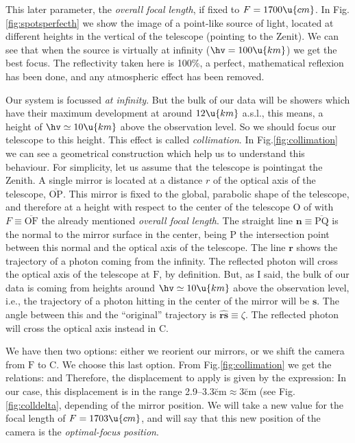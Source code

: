 This later parameter, the \emph{overall focal length}, if fixed to
$F=1700\u{cm}$. In Fig.\ref{fig:spotsperfecth} we show the image of a
point-like source of light, located at different heights \hv in the
vertical of the telescope (pointing to the Zenit). We can see that
when the source is virtually at infinity ($\hv=100\u{km}$) we get the
best focus. The reflectivity taken here is 100\%, a perfect,
mathematical reflexion has been done, and any atmospheric effect has
been removed.

Our system is focussed \emph{at infinity}. But the bulk of our data
will be showers which have their maximum development at around
$12\u{km}$ a.s.l., this means, a height of $\hv\simeq 10\u{km}$ above
the observation level.  So we should focus our telescope to this
height.  This effect is called \emph{collimation}. In
Fig.\ref{fig:collimation} we can see a geometrical construction which
help us to understand this behaviour.  For simplicity, let us assume
that the telescope is pointingat the Zenith. A single mirror is
located at a distance $r$ of the optical axis of the telescope,
$\overline{\mathrm{OP}}$. This mirror is fixed to the global,
parabolic shape of the telescope, and therefore at a height with
respect to the center of the telescope $\mathrm{O}$ of
%
\zparabeq
%
with $F\equiv\overline{\mathrm{OF}}$ the already mentioned
\emph{overall focal length}. The straight line
$\mathbf{n}\equiv\overline{\mathrm{PQ}}$ is the normal to the mirror
surface in the center, being $\mathrm{P}$ the intersection point
between this normal and the optical axis of the telescope. The line
$\mathbf{r}$ shows the trajectory of a photon coming from the
infinity. The reflected photon will cross the optical axis of the
telescope at $\mathrm{F}$, by definition. But, as I said, the bulk of
our data is coming from heights around $\hv\simeq 10\u{km}$ above the
observation level, i.e., the trajectory of a photon hitting in the
center of the mirror will be $\mathbf{s}$. The angle between this and
the ``original'' trajectory is $\widehat{\mathbf{rs}}\equiv\zeta$. The
reflected photon will cross the optical axis instead in $\mathrm{C}$.

\collimationfig

\colldeltafig

We have then two options: either we reorient our mirrors, or we shift
the camera from $\mathrm{F}$ to $\mathrm{C}$. We choose this last
option. From Fig.\ref{fig:collimation} we get the relations:
%
\relationsAeq
%
and
%
\relationsBeq
%
Therefore, the displacement to apply is given by the expression:
%
\collimationeq
%
In our case, this displacement is in the range
2.9--3.3\u{cm}$\approx$3\u{cm} (see Fig.\ref{fig:colldelta}, depending
of the mirror position. We will take a new value for the focal length
of $F=1703\u{cm}$, and will say that this new position of the camera
is the \emph{optimal-focus position}.

